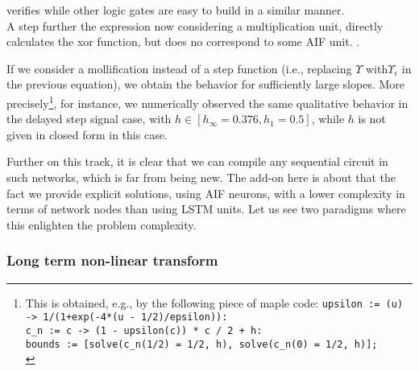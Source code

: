 {
verifies 
while other logic gates are easy to build in a similar manner.\\ A step further the expression 
now considering a multiplication unit, directly calculates the xor function, but does no correspond to some AIF unit.
\hr}. 

If we consider a mollification instead of a step function (i.e., replacing $\Upsilon$ with$\Upsilon_\epsilon$ in the previous equation), we obtain the behavior for sufficiently large slopes. More precisely\footnote{This is obtained, e.g., by the following piece of maple code: {\tt upsilon := (u) -> 1/(1+exp(-4*(u - 1/2)/epsilon)):\\
c\_n := c -> (1 - upsilon(c)) * c / 2 + h:\\
bounds := [solve(c\_n(1/2) = 1/2, h), solve(c\_n(0) = 1/2, h)];\\}\hr}, for instance, we numerically observed the same qualitative behavior in the delayed step signal case, with $h \in [h_\infty = 0.376, h_1 = 0.5]$, while $h$ is not given in closed form in this case.

Further on this track, it is clear that we can compile any sequential circuit in such networks, which is far from being new. The add-on here is about that the fact we provide explicit solutions, using AIF neurons, with a lower complexity in terms of network nodes than using LSTM units. Let us see two paradigms where this enlighten the problem complexity.

\subsubsection*{Long term non-linear transform}

